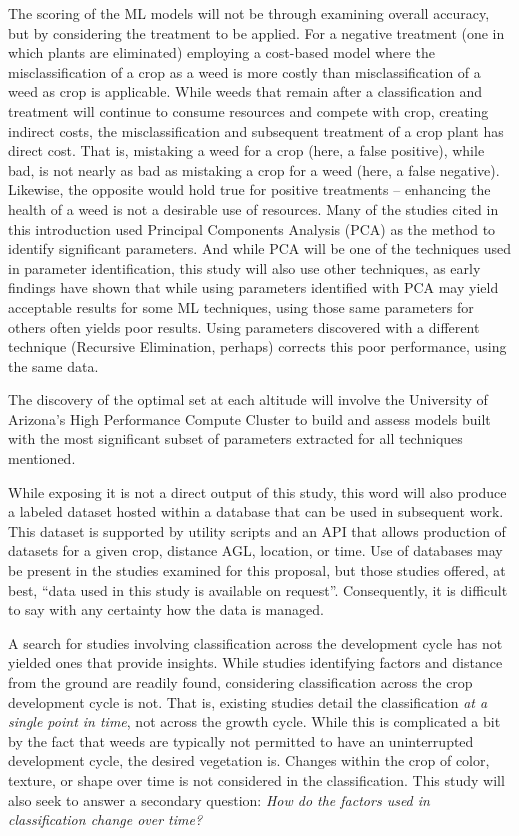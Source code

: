 \documentclass[12pt]{article}
\begin{document}
 The scoring of the ML models will not be through examining overall accuracy, but by considering the treatment to be applied.  For a negative treatment (one in which plants are eliminated) employing a cost-based model where the misclassification of a crop as a weed is more costly than misclassification of a weed as crop is applicable. While weeds that remain after a classification and treatment will continue to consume resources and compete with crop, creating indirect costs, the misclassification and subsequent treatment of a crop plant has direct cost. That is, mistaking a weed for a crop (here, a false positive), while bad, is not nearly as bad as mistaking a crop for a weed (here, a false negative). Likewise, the opposite would hold true for positive treatments -- enhancing the health of a weed is not a desirable use of resources.  Many of the studies cited in this introduction used Principal Components Analysis (PCA) as the method to identify significant parameters. And while PCA will be one of the techniques used in parameter identification, this study will also use other techniques, as early findings have shown that while using parameters identified with PCA may yield acceptable results for some ML techniques, using those same parameters for others often yields poor results. Using parameters discovered with a different technique (Recursive Elimination, perhaps) corrects this poor performance, using the same data.
 
 The discovery of the optimal set at each altitude will involve the University of Arizona's High Performance Compute Cluster to build and assess models built with the most significant subset of parameters extracted for all techniques mentioned.
 
While exposing it is not a direct output of this study, this word will also produce a labeled dataset hosted within a database that can be used in subsequent work. This dataset is supported by utility scripts and an API that allows production of datasets for a given crop, distance AGL, location, or time. Use of databases may be present in the studies examined for this proposal, but those studies offered, at best, ``data used in this study is available on request''. Consequently, it is difficult to say with any certainty how the data is managed. 
 
 A search for studies involving classification across the development cycle has not yielded ones that provide insights. While studies identifying factors and distance from the ground are readily found, considering classification across the crop development cycle is not. That is, existing studies detail the classification \textit{at a single point in time}, not across the growth cycle. While this is complicated a bit by the fact that weeds are typically not permitted to have an uninterrupted development cycle, the desired vegetation is. Changes within the crop of color, texture, or shape over time is not considered in the classification. This study will also seek to answer a secondary question: \textit{How do the factors used in classification change over time?}
 
\end{document}
